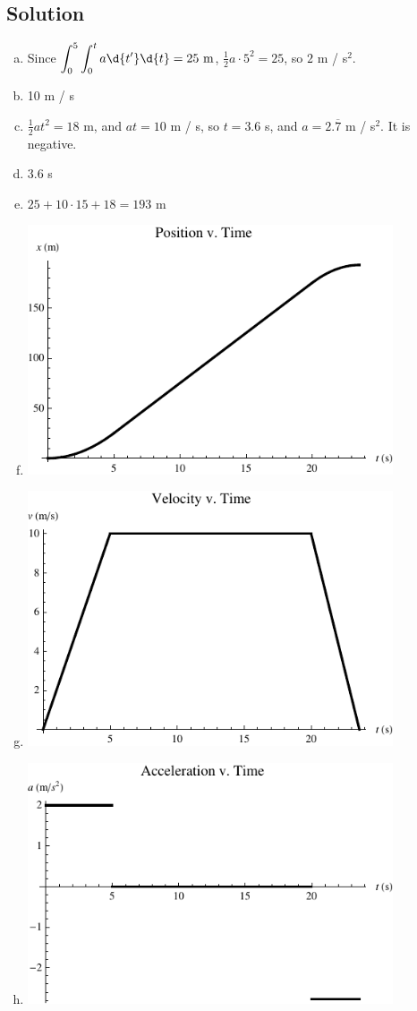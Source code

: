 \documentclass[solutions]{esg8012pset}
\begin{document}
\subsection*{Solution}
  \begin{enumerate}[a)]
    \item Since $\displaystyle \int_{0}^{5}\int_{0}^{t} a \d{t'}\d{t} = 25\ \text{m}$, $\frac{1}{2}a \cdot 5^2 = 25$, so $2$ m / s$^2$.
    \item 10 m / s
    \item $\frac{1}{2}at^2 = 18$ m, and $at = 10$ m / s, so $t = 3.6$ s, and $a = 2.\overline{7}$ m / s$^2$.  It is negative.
    \item 3.6 s
    \item $25 + 10 \cdot 15 + 18 = 193$ m
    \item \includegraphics[width=0.85\textwidth]{ps01_Plot_1}
    \item \includegraphics[width=0.85\textwidth]{ps01_Plot_2}
    \item \includegraphics[width=0.85\textwidth]{ps01_Plot_3}
  \end{enumerate}
\end{document}

